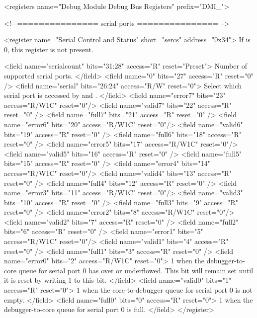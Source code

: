 <registers name="Debug Module Debug Bus Registers" prefix="DMI_">

    <!-- =============== serial ports =============== -->

    <register name="Serial Control and Status" short="sercs" address="0x34">
        If \Fserialcount is 0, this register is not present.

        <field name="serialcount" bits="31:28" access="R" reset="Preset">
            Number of supported serial ports.
        </field>
        <field name="0" bits="27" access="R" reset="0" />
        <field name="serial" bits="26:24" access="R/W" reset="0">
            Select which serial port is accessed by \Rserrx and \Rsertx.
        </field>
        <field name="error7" bits="23" access="R/W1C" reset="0"/>
        <field name="valid7" bits="22" access="R" reset="0" />
        <field name="full7" bits="21" access="R" reset="0" />
        <field name="error6" bits="20" access="R/W1C" reset="0"/>
        <field name="valid6" bits="19" access="R" reset="0" />
        <field name="full6" bits="18" access="R" reset="0" />
        <field name="error5" bits="17" access="R/W1C" reset="0"/>
        <field name="valid5" bits="16" access="R" reset="0" />
        <field name="full5" bits="15" access="R" reset="0" />
        <field name="error4" bits="14" access="R/W1C" reset="0"/>
        <field name="valid4" bits="13" access="R" reset="0" />
        <field name="full4" bits="12" access="R" reset="0" />
        <field name="error3" bits="11" access="R/W1C" reset="0"/>
        <field name="valid3" bits="10" access="R" reset="0" />
        <field name="full3" bits="9" access="R" reset="0" />
        <field name="error2" bits="8" access="R/W1C" reset="0"/>
        <field name="valid2" bits="7" access="R" reset="0" />
        <field name="full2" bits="6" access="R" reset="0" />
        <field name="error1" bits="5" access="R/W1C" reset="0"/>
        <field name="valid1" bits="4" access="R" reset="0" />
        <field name="full1" bits="3" access="R" reset="0" />
        <field name="error0" bits="2" access="R/W1C" reset="0">
            1 when the debugger-to-core queue for serial port 0 has
            over or underflowed. This bit will remain set until it is reset by
            writing 1 to this bit.
        </field>
        <field name="valid0" bits="1" access="R" reset="0">
            1 when the core-to-debugger queue for serial port 0 is not empty.
        </field>
        <field name="full0" bits="0" access="R" reset="0">
            1 when the debugger-to-core queue for serial port 0 is full.
        </field>
    </register>

